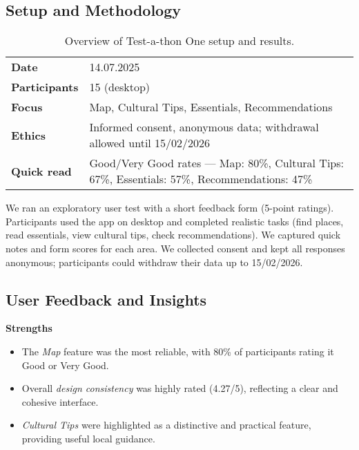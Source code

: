 \subsection{Setup and Methodology}
\begin{table}[h!]
\centering
\small
\begin{tabular}{p{3cm}p{10cm}}
\hline
\textbf{Date} & 14.07.2025 \\
\textbf{Participants} & 15 (desktop) \\
\textbf{Focus} & Map, Cultural Tips, Essentials, Recommendations \\
\textbf{Ethics} & Informed consent, anonymous data; withdrawal allowed until 15/02/2026 \\
\textbf{Quick read} & Good/Very Good rates — Map: 80\%, Cultural Tips: 67\%, Essentials: 57\%, Recommendations: 47\% \\
\hline
\end{tabular}
\caption{Overview of Test-a-thon One setup and results.}
\label{tab:testathon1-overview}
\end{table}



\noindent We ran an exploratory user test with a short feedback form (5-point ratings).
Participants used the app on desktop and completed realistic tasks (find places, read essentials, view cultural tips, check recommendations). We captured quick notes and form scores for each area. 
We collected consent and kept all responses anonymous; participants could withdraw their data up to 15/02/2026. 

\subsection{User Feedback and Insights}

\textbf{Strengths}
\begin{itemize}\setlength\itemsep{0.3em}
    \item The \emph{Map} feature was the most reliable, with 80\% of participants rating it Good or Very Good. 
    \item Overall \emph{design consistency} was highly rated (4.27/5), reflecting a clear and cohesive interface. 
    \item \emph{Cultural Tips} were highlighted as a distinctive and practical feature, providing useful local guidance. 
\end{itemize}


